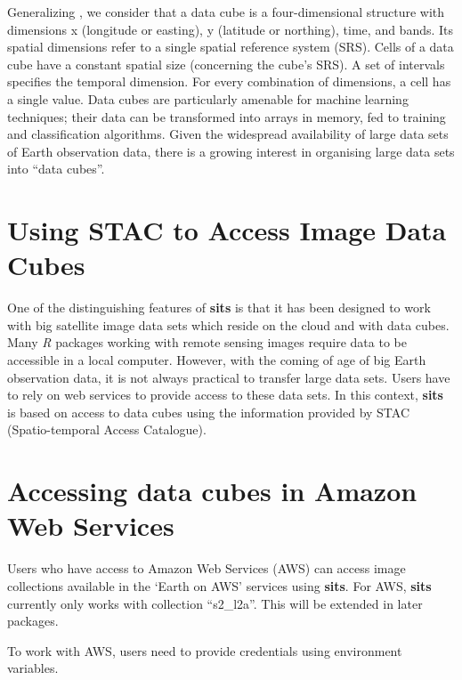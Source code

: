 \documentclass[a4paper,]{tufte-book}
\begin{document}
Generalizing \citet{Appel2019}, we consider that a data cube is a four-dimensional structure with dimensions x (longitude or easting), y (latitude or northing), time, and bands. Its spatial dimensions refer to a single spatial reference system (SRS). Cells of a data cube have a constant spatial size (concerning the cube's SRS). A set of intervals specifies the temporal dimension. For every combination of dimensions, a cell has a single value. Data cubes are particularly amenable for machine learning techniques; their data can be transformed into arrays in memory, fed to training and classification algorithms. Given the widespread availability of large data sets of Earth observation data, there is a growing interest in organising large data sets into ``data cubes''.

\hypertarget{using-stac-to-access-image-data-cubes}{%
\section{Using STAC to Access Image Data Cubes}\label{using-stac-to-access-image-data-cubes}}

One of the distinguishing features of \textbf{sits} is that it has been designed to work with big satellite image data sets which reside on the cloud and with data cubes. Many \emph{R} packages working with remote sensing images require data to be accessible in a local computer. However, with the coming of age of big Earth observation data, it is not always practical to transfer large data sets. Users have to rely on web services to provide access to these data sets. In this context, \textbf{sits} is based on access to data cubes using the information provided by STAC (Spatio-temporal Access Catalogue).

\hypertarget{accessing-data-cubes-in-amazon-web-services}{%
\section{Accessing data cubes in Amazon Web Services}\label{accessing-data-cubes-in-amazon-web-services}}

Users who have access to Amazon Web Services (AWS) can access image collections
available in the `Earth on AWS' services using \textbf{sits}. For AWS, \textbf{sits} currently
only works with collection ``s2\_l2a''. This will be extended in later packages.

To work with AWS, users need to provide credentials using environment variables.
\end{document}
